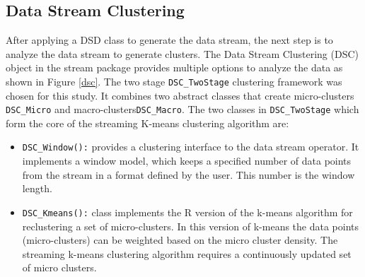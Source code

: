 \documentclass[../UNBThesis2.tex]{subfiles}
\begin{document}

\subsection{Data Stream Clustering}
After applying a DSD class to generate the data stream, the next step is to analyze the data stream to generate clusters. The Data Stream Clustering (DSC) object in the stream package provides multiple options to analyze the data as shown in Figure \ref{dsc}. The two stage \texttt{DSC\_TwoStage} clustering framework was chosen for this study. It combines two abstract classes that create micro-clusters \texttt{DSC\_Micro} and macro-clusters\texttt{DSC\_Macro}.
The two classes in \texttt{DSC\_TwoStage} which form the core of the streaming K-means clustering algorithm are: 

    \begin{itemize}
        \item\texttt{DSC\_Window():} provides a clustering interface to the data stream operator. It implements a window model, which keeps a specified number of data points from the stream in a format defined by the user. This number is the window length. 
        
        \item\texttt{DSC\_Kmeans():} class implements the R version of the k-means algorithm for reclustering a set of micro-clusters. In this version of k-means the data points (micro-clusters) can be weighted based on the micro cluster density. The streaming k-means clustering algorithm requires a continuously updated set of micro clusters.

    \end{itemize}
\end{document}
